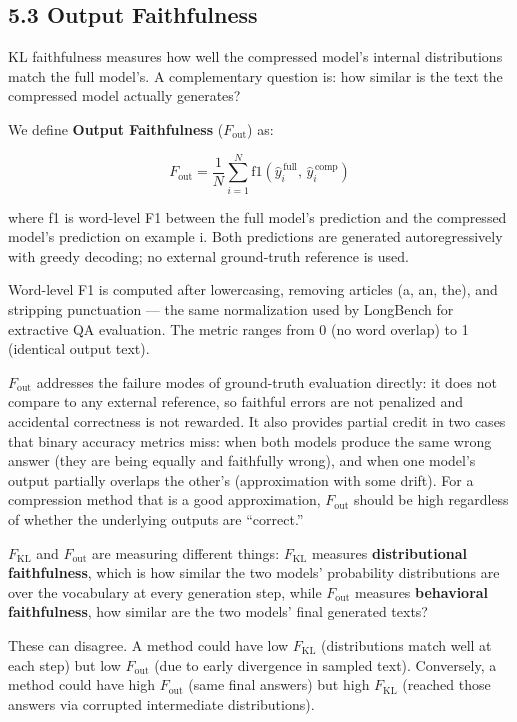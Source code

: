 \documentclass[10pt,letterpaper]{article}
\begin{document}
\hypertarget{output-faithfulness}{%
\subsection{5.3 Output Faithfulness}\label{output-faithfulness}}

KL faithfulness measures how well the compressed model's internal
distributions match the full model's. A complementary question is: how
similar is the text the compressed model actually generates?

We define \textbf{Output Faithfulness} (\(F_{\text{out}}\)) as:

\[
F_{\text{out}} = \frac{1}{N} \sum_{i=1}^{N}
  \text{f1}\!\left(\hat{y}^{\,\text{full}}_i,\, \hat{y}^{\,\text{comp}}_i\right)
\]

where f1 is word-level F1 between the full model's prediction and the
compressed model's prediction on example i. Both predictions are
generated autoregressively with greedy decoding; no external
ground-truth reference is used.

Word-level F1 is computed after lowercasing, removing articles (a, an,
the), and stripping punctuation --- the same normalization used by
LongBench for extractive QA evaluation. The metric ranges from 0 (no
word overlap) to 1 (identical output text).

\(F_{\text{out}}\) addresses the failure modes of ground-truth
evaluation directly: it does not compare to any external reference, so
faithful errors are not penalized and accidental correctness is not
rewarded. It also provides partial credit in two cases that binary
accuracy metrics miss: when both models produce the same wrong answer
(they are being equally and faithfully wrong), and when one model's
output partially overlaps the other's (approximation with some drift).
For a compression method that is a good approximation,
\(F_{\text{out}}\) should be high regardless of whether the underlying
outputs are ``correct.''

\(F_{\text{KL}}\) and \(F_{\text{out}}\) are measuring different things:
\(F_{\text{KL}}\) measures \textbf{distributional faithfulness}, which is how
similar the two models' probability distributions are over the
vocabulary at every generation step, while \(F_{\text{out}}\) measures
\textbf{behavioral faithfulness}, how similar are the two models' final
generated texts?

These can disagree. A method could have low \(F_{\text{KL}}\)
(distributions match well at each step) but low \(F_{\text{out}}\) (due
to early divergence in sampled text). Conversely, a method could have
high \(F_{\text{out}}\) (same final answers) but high \(F_{\text{KL}}\)
(reached those answers via corrupted intermediate distributions).
\end{document}
